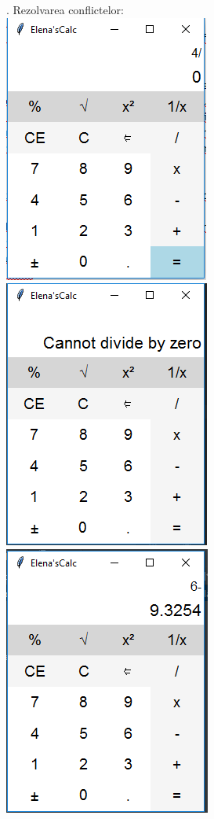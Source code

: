 \documentclass[12pt]{article}
\begin{document}
.
Rezolvarea conflictelor:\\
\includegraphics{divide.png}\\

\includegraphics{0.png}\\

\includegraphics{decimals.png}\\
\end{document}
